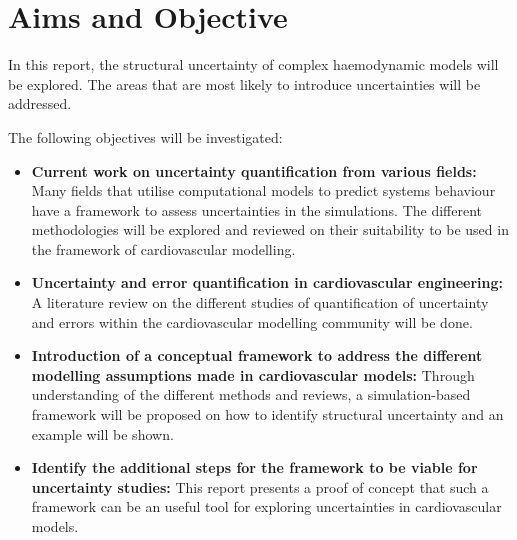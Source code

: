 \chapter{Aims and Objective}
\label{chapterlabel3}



In this report, the structural uncertainty of complex haemodynamic models will be explored. The areas that are most likely to introduce uncertainties will be addressed.\par

The following objectives will be investigated:
\begin{itemize}
    \item \textbf{Current work on uncertainty quantification from various fields:} Many fields that utilise computational models to predict systems behaviour have a framework to assess uncertainties in the simulations. The different methodologies will be explored and reviewed on their suitability to be used in the framework of cardiovascular modelling.
    \item \textbf{Uncertainty and error quantification in cardiovascular engineering:} A literature review on the different studies of quantification of uncertainty and errors within the cardiovascular modelling community will be done.
    \item \textbf{Introduction of a conceptual framework to address the different modelling assumptions made in cardiovascular models:} Through understanding of the different methods and reviews, a simulation-based framework will be proposed on how to identify structural uncertainty and an example will be shown.
    \item \textbf{Identify the additional steps for the framework to be viable for uncertainty studies:} This report presents a proof of concept that such a framework can be an useful tool for exploring uncertainties in cardiovascular models.
\end{itemize}